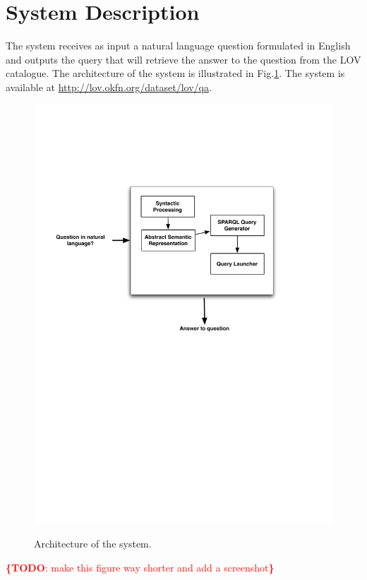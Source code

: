 \documentclass[runningheads,a4paper]{llncs}
\newcommand{\todo}[1]{\noindent\textcolor{red}{{\bf \{TODO}: #1{\bf \}}}}
\begin{document}
\section{System Description}
\label{sec:system}

The system receives as input a natural language question formulated in English and outputs the query that will retrieve the answer to the question from the LOV catalogue. The architecture of the system is illustrated in Fig.\ref{fig:q4lovarchi}. The system is available at \url{http://lov.okfn.org/dataset/lov/qa}.

\begin{figure}[ht!b]
\centering
\caption{Architecture of the system.}
\includegraphics[scale=.6]{qa4lov-archi.pdf}
\label{fig:q4lovarchi}
\end{figure}
\todo{make this figure way shorter and add a screenshot}
\end{document}
